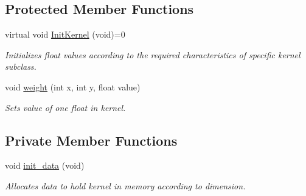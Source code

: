 \subsection*{Protected Member Functions}
\begin{DoxyCompactItemize}
\item 
virtual void \hyperlink{classimage__tools_1_1Kernel_a992eb6d2745830456615044fd2fd03f3}{Init\+Kernel} (void)=0\hypertarget{classimage__tools_1_1Kernel_a992eb6d2745830456615044fd2fd03f3}{}\label{classimage__tools_1_1Kernel_a992eb6d2745830456615044fd2fd03f3}

\begin{DoxyCompactList}\small\item\em Initializes float values according to the required characteristics of specific kernel subclass. \end{DoxyCompactList}\item 
void \hyperlink{classimage__tools_1_1Kernel_aab6ed71b5dbc02a8cc8d2549455b24c9}{weight} (int x, int y, float value)\hypertarget{classimage__tools_1_1Kernel_aab6ed71b5dbc02a8cc8d2549455b24c9}{}\label{classimage__tools_1_1Kernel_aab6ed71b5dbc02a8cc8d2549455b24c9}

\begin{DoxyCompactList}\small\item\em Sets value of one float in kernel. \end{DoxyCompactList}\end{DoxyCompactItemize}
\subsection*{Private Member Functions}
\begin{DoxyCompactItemize}
\item 
void \hyperlink{classimage__tools_1_1Kernel_a4774b5c4395c405302447fc2c87f6497}{init\+\_\+data} (void)\hypertarget{classimage__tools_1_1Kernel_a4774b5c4395c405302447fc2c87f6497}{}\label{classimage__tools_1_1Kernel_a4774b5c4395c405302447fc2c87f6497}

\begin{DoxyCompactList}\small\item\em Allocates data to hold kernel in memory according to dimension. \end{DoxyCompactList}\end{DoxyCompactItemize}
